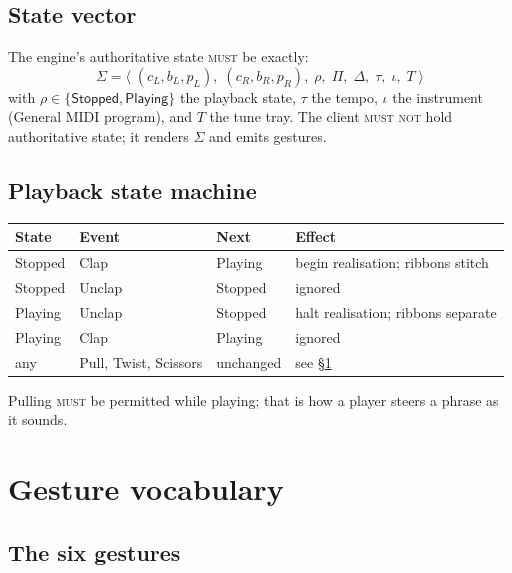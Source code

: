 \documentclass[11pt,a4paper]{article}
\newcommand{\MUST}{\textsc{must}}
\newcommand{\MUSTNOT}{\textsc{must not}}
\theoremstyle{definition}
\theoremstyle{plain}
\theoremstyle{remark}
\begin{document}
\subsection{State vector}

The engine's authoritative state \MUST{} be exactly:
\[
\Sigma = \big\langle\;
(c_L, b_L, p_L),\;
(c_R, b_R, p_R),\;
\rho,\;
\Pi,\; \Delta,\; \tau,\; \iota,\;
T
\;\big\rangle
\]
with $\rho \in \{\textsf{Stopped}, \textsf{Playing}\}$ the playback state, $\tau$ the tempo,
$\iota$ the instrument (General MIDI program), and $T$ the tune tray. The client \MUSTNOT{} hold
authoritative state; it renders $\Sigma$ and emits gestures.

\subsection{Playback state machine}

\begin{center}
\begin{tabular}{llll}
\toprule
\textbf{State} & \textbf{Event} & \textbf{Next} & \textbf{Effect} \\
\midrule
\textsf{Stopped} & \textsf{Clap}   & \textsf{Playing} & begin realisation; ribbons stitch \\
\textsf{Stopped} & \textsf{Unclap} & \textsf{Stopped} & ignored \\
\textsf{Playing} & \textsf{Unclap} & \textsf{Stopped} & halt realisation; ribbons separate \\
\textsf{Playing} & \textsf{Clap}   & \textsf{Playing} & ignored \\
any & \textsf{Pull}, \textsf{Twist}, \textsf{Scissors} & unchanged & see \S\ref{sec:gestures} \\
\bottomrule
\end{tabular}
\end{center}

Pulling \MUST{} be permitted while playing; that is how a player steers a phrase as it sounds.

\section{Gesture vocabulary}
\label{sec:gestures}

\subsection{The six gestures}
\end{document}

